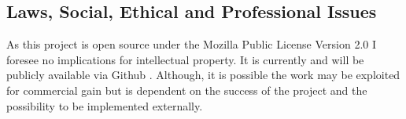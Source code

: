 \documentclass [11pt,a4paper]{article}
\begin{document}




\subsection{Laws, Social, Ethical and Professional Issues}
\label{sec:computer_laws}
As this project is open source under the Mozilla Public License Version 2.0 I foresee no implications for intellectual property. It is currently and will be publicly available via Github \cite{keeptrackgithub}. Although, it is possible the work may be exploited for commercial gain but is dependent on the success of the project and the possibility to be implemented externally.
\end{document}
